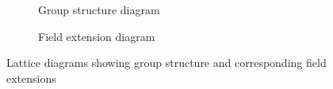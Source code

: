   \begin{figure}[H]
    \centering
    \begin{subfigure}[b]{0.48\textwidth}
      \centering
      \caption{Group structure diagram}
      \label{fig:group_structure}
    \end{subfigure}
    \hfill 
    \begin{subfigure}[b]{0.48\textwidth}
      \centering
      \caption{Field extension diagram}
      \label{fig:field_extension}
    \end{subfigure}
    \caption{Lattice diagrams showing group structure and corresponding field extensions}
    \label{fig:lattice_diagrams}
  \end{figure}

